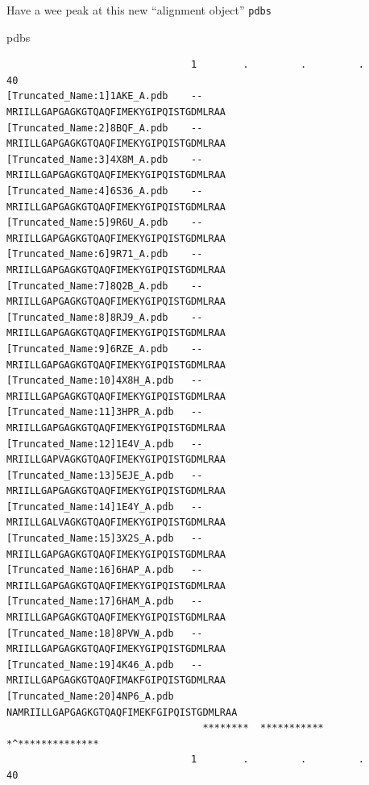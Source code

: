 \documentclass[
  letterpaper,
  DIV=11,
  numbers=noendperiod]{scrartcl}
\newenvironment{Shaded}{\begin{snugshade}}{\end{snugshade}}
\newcommand{\NormalTok}[1]{\textcolor[rgb]{0.00,0.23,0.31}{#1}}
\begin{document}
Have a wee peak at this new ``alignment object'' \texttt{pdbs}

\begin{Shaded}
\begin{Highlighting}[]
\NormalTok{pdbs}
\end{Highlighting}
\end{Shaded}

\begin{verbatim}
                                1        .         .         .         40 
[Truncated_Name:1]1AKE_A.pdb    --MRIILLGAPGAGKGTQAQFIMEKYGIPQISTGDMLRAA
[Truncated_Name:2]8BQF_A.pdb    --MRIILLGAPGAGKGTQAQFIMEKYGIPQISTGDMLRAA
[Truncated_Name:3]4X8M_A.pdb    --MRIILLGAPGAGKGTQAQFIMEKYGIPQISTGDMLRAA
[Truncated_Name:4]6S36_A.pdb    --MRIILLGAPGAGKGTQAQFIMEKYGIPQISTGDMLRAA
[Truncated_Name:5]9R6U_A.pdb    --MRIILLGAPGAGKGTQAQFIMEKYGIPQISTGDMLRAA
[Truncated_Name:6]9R71_A.pdb    --MRIILLGAPGAGKGTQAQFIMEKYGIPQISTGDMLRAA
[Truncated_Name:7]8Q2B_A.pdb    --MRIILLGAPGAGKGTQAQFIMEKYGIPQISTGDMLRAA
[Truncated_Name:8]8RJ9_A.pdb    --MRIILLGAPGAGKGTQAQFIMEKYGIPQISTGDMLRAA
[Truncated_Name:9]6RZE_A.pdb    --MRIILLGAPGAGKGTQAQFIMEKYGIPQISTGDMLRAA
[Truncated_Name:10]4X8H_A.pdb   --MRIILLGAPGAGKGTQAQFIMEKYGIPQISTGDMLRAA
[Truncated_Name:11]3HPR_A.pdb   --MRIILLGAPGAGKGTQAQFIMEKYGIPQISTGDMLRAA
[Truncated_Name:12]1E4V_A.pdb   --MRIILLGAPVAGKGTQAQFIMEKYGIPQISTGDMLRAA
[Truncated_Name:13]5EJE_A.pdb   --MRIILLGAPGAGKGTQAQFIMEKYGIPQISTGDMLRAA
[Truncated_Name:14]1E4Y_A.pdb   --MRIILLGALVAGKGTQAQFIMEKYGIPQISTGDMLRAA
[Truncated_Name:15]3X2S_A.pdb   --MRIILLGAPGAGKGTQAQFIMEKYGIPQISTGDMLRAA
[Truncated_Name:16]6HAP_A.pdb   --MRIILLGAPGAGKGTQAQFIMEKYGIPQISTGDMLRAA
[Truncated_Name:17]6HAM_A.pdb   --MRIILLGAPGAGKGTQAQFIMEKYGIPQISTGDMLRAA
[Truncated_Name:18]8PVW_A.pdb   --MRIILLGAPGAGKGTQAQFIMEKYGIPQISTGDMLRAA
[Truncated_Name:19]4K46_A.pdb   --MRIILLGAPGAGKGTQAQFIMAKFGIPQISTGDMLRAA
[Truncated_Name:20]4NP6_A.pdb   NAMRIILLGAPGAGKGTQAQFIMEKFGIPQISTGDMLRAA
                                  ********  *********** *^************** 
                                1        .         .         .         40 


\end{verbatim}
\end{document}
